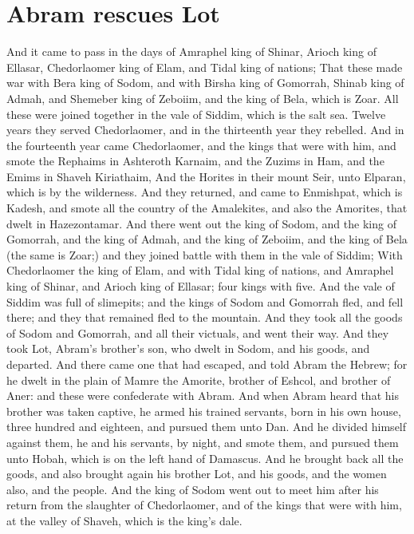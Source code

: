\section*{Abram rescues Lot}
\begin{biblechapter} %
\verse And it came to pass in the days of Amraphel king of Shinar, Arioch king of Ellasar, Chedorlaomer king of Elam, and Tidal king of nations;
\verse That these made war with Bera king of Sodom, and with Birsha king of Gomorrah, Shinab king of Admah, and Shemeber king of Zeboiim, and the king of Bela, which is Zoar.
\verse All these were joined together in the vale of Siddim, which is the salt sea.
\verse Twelve years they served Chedorlaomer, and in the thirteenth year they rebelled.
\verse And in the fourteenth year came Chedorlaomer, and the kings that were with him, and smote the Rephaims in Ashteroth Karnaim, and the Zuzims in Ham, and the Emims in Shaveh Kiriathaim,
\verse And the Horites in their mount Seir, unto Elparan, which is by the wilderness.
\verse And they returned, and came to Enmishpat, which is Kadesh, and smote all the country of the Amalekites, and also the Amorites, that dwelt in Hazezontamar.
\verse And there went out the king of Sodom, and the king of Gomorrah, and the king of Admah, and the king of Zeboiim, and the king of Bela (the same is Zoar;) and they joined battle with them in the vale of Siddim;
\verse With Chedorlaomer the king of Elam, and with Tidal king of nations, and Amraphel king of Shinar, and Arioch king of Ellasar; four kings with five.
\verse And the vale of Siddim was full of slimepits; and the kings of Sodom and Gomorrah fled, and fell there; and they that remained fled to the mountain.
\verse And they took all the goods of Sodom and Gomorrah, and all their victuals, and went their way.
\verse And they took Lot, Abram's brother's son, who dwelt in Sodom, and his goods, and departed.
\verse And there came one that had escaped, and told Abram the Hebrew; for he dwelt in the plain of Mamre the Amorite, brother of Eshcol, and brother of Aner: and these were confederate with Abram.
\verse And when Abram heard that his brother was taken captive, he armed his trained servants, born in his own house, three hundred and eighteen, and pursued them unto Dan.
\verse And he divided himself against them, he and his servants, by night, and smote them, and pursued them unto Hobah, which is on the left hand of Damascus.
\verse And he brought back all the goods, and also brought again his brother Lot, and his goods, and the women also, and the people.
\verse And the king of Sodom went out to meet him after his return from the slaughter of Chedorlaomer, and of the kings that were with him, at the valley of Shaveh, which is the king's dale.

\end{biblechapter}
